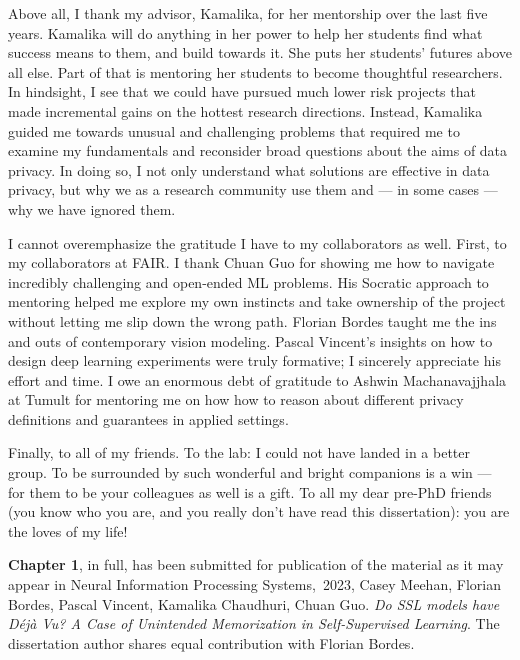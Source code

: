 \documentclass[12pt]{ucsddissertation}
\begin{document}
\begin{acknowledgements}
Above all, I thank my advisor, Kamalika, for her mentorship over the last five years. Kamalika will do anything in her power to help her students find what success means to them, and build towards it. She puts her students' futures above all else. Part of that is mentoring her students to become thoughtful researchers. In hindsight, I see that we could have pursued much lower risk projects that made incremental gains on the hottest research directions. Instead, Kamalika guided me towards unusual and challenging problems that required me to examine my fundamentals and reconsider broad questions about the aims of data privacy. In doing so, I not only understand what solutions are effective in data privacy, but why we as a research community use them and --- in some cases --- why we have ignored them. 

I cannot overemphasize the gratitude I have to my collaborators as well. First, to my collaborators at FAIR. I thank Chuan Guo for showing me how to navigate incredibly challenging and open-ended ML problems. His Socratic approach to mentoring helped me explore my own instincts and take ownership of the project without letting me slip down the wrong path. Florian Bordes taught me the ins and outs of contemporary vision modeling. Pascal Vincent's insights on how to design deep learning experiments were truly formative; I sincerely appreciate his effort and time. I owe an enormous debt of gratitude to Ashwin Machanavajjhala at Tumult for mentoring me on how how to reason about different privacy definitions and guarantees in applied settings. 

Finally, to all of my friends. To the lab: I could not have landed in a better group. To be surrounded by such wonderful and bright companions is a win --- for them to be your colleagues as well is a gift. To all my dear pre-PhD friends (you know who you are, and you really don't have read this dissertation): you are the loves of my life! 

\pagebreak

\textbf{Chapter 1}, in full, has been submitted for publication of the material
as it may appear in Neural Information Processing Systems,~2023, Casey Meehan, Florian Bordes, Pascal Vincent, Kamalika Chaudhuri, Chuan Guo. \emph{Do SSL models have Déjà Vu? A Case of Unintended Memorization in Self-Supervised Learning}. The dissertation author shares equal contribution with Florian Bordes. 


\end{acknowledgements}
\end{document}
